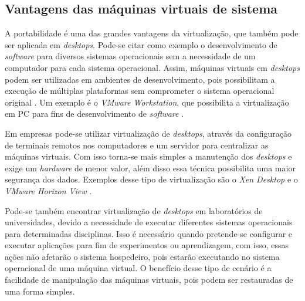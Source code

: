 \subsection{Vantagens das máquinas virtuais de sistema}
\label{section:virtvantag}

A portabilidade é uma das grandes vantagens da virtualização, que também pode ser aplicada em \textit{desktops}. Pode-se citar como exemplo 
o desenvolvimento de \textit{software} para diversos sistemas operacionais sem a necessidade de um computador para cada sistema operacional. 
Assim, máquinas virtuais em \textit{desktops} podem ser utilizadas em ambientes de desenvolvimento, pois possibilitam a execução de múltiplas 
plataformas sem comprometer o sistema operacional original \cite{carissimi2008}. Um exemplo é o \textit{VMware Workstation}, que possibilita 
a virtualização em \ac{PC} para fins de desenvolvimento de \textit{software} \cite{vmware2016}.

Em empresas pode-se utilizar virtualização de \textit{desktops}, através da configuração de terminais remotos nos computadores e um servidor 
para centralizar as máquinas virtuais. Com isso torna-se mais simples a manutenção dos \textit{desktops} e exige um \textit{hardware} de 
menor valor, além disso essa técnica possibilita uma maior segurança dos dados. Exemplos desse tipo de virtualização são o \textit{Xen Desktop}
\cite{xendesktop} e o \textit{VMware Horizon View} \cite{vmwareview}.

Pode-se também encontrar virtualização de \textit{desktops} em laboratórios de universidades, devido a necessidade de executar diferentes sistemas 
operacionais para determinadas disciplinas. Isso é necessário quando pretende-se configurar e executar aplicações para fim de experimentos ou
aprendizagem, com isso, essas ações não afetarão o sistema hospedeiro, pois estarão executando no sistema operacional de uma máquina virtual. 
O benefício desse tipo de cenário é a facilidade de manipulação das máquinas virtuais, pois podem ser restauradas de uma forma simples.

